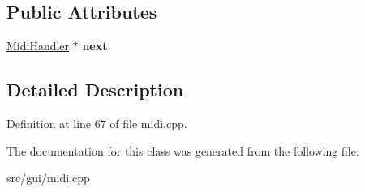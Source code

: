 \subsection*{Public Attributes}
\begin{DoxyCompactItemize}
\item 
\hypertarget{classMidiHandler_a32f0f5cac10b1b566ffa969826b6cf99}{\hyperlink{classMidiHandler}{Midi\-Handler} $\ast$ {\bfseries next}}\label{classMidiHandler_a32f0f5cac10b1b566ffa969826b6cf99}

\end{DoxyCompactItemize}


\subsection{Detailed Description}


Definition at line 67 of file midi.\-cpp.



The documentation for this class was generated from the following file\-:\begin{DoxyCompactItemize}
\item 
src/gui/midi.\-cpp\end{DoxyCompactItemize}

